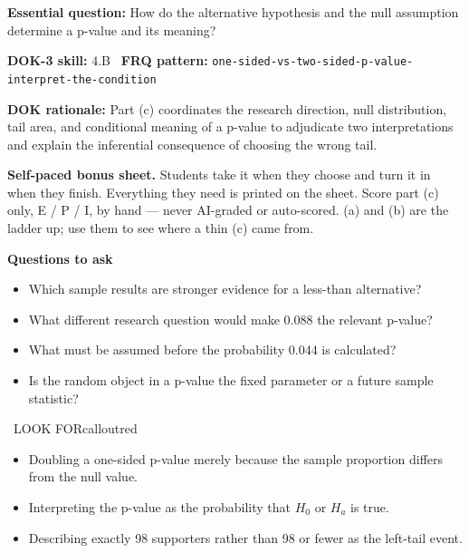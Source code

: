 \documentclass[11pt]{article}
\begin{document}
\textbf{Essential question:} How do the alternative hypothesis and the null assumption determine a p-value and its meaning?\par
\textbf{DOK-3 skill:} 4.B \textperiodcentered\ \textbf{FRQ pattern:} {\small\texttt{one-\allowbreak{}sided-\allowbreak{}vs-\allowbreak{}two-\allowbreak{}sided-\allowbreak{}p-\allowbreak{}value-\allowbreak{}interpret-\allowbreak{}the-\allowbreak{}condition}}\par
\textbf{DOK rationale:} Part (c) coordinates the research direction, null distribution, tail area, and conditional meaning of a p-value to adjudicate two interpretations and explain the inferential consequence of choosing the wrong tail.\par

\textbf{Self-paced bonus sheet.} Students take it when they choose and turn it in when they finish. Everything they need is printed on the sheet. Score part (c) only, E / P / I, by hand --- never AI-graded or auto-scored. (a) and (b) are the ladder up; use them to see where a thin (c) came from.\par

\textbf{Questions to ask}
\begin{itemize}[leftmargin=1.5em,itemsep=2pt,topsep=2pt]
  \item Which sample results are stronger evidence for a less-than alternative?
  \item What different research question would make $0.088$ the relevant p-value?
  \item What must be assumed before the probability $0.044$ is calculated?
  \item Is the random object in a p-value the fixed parameter or a future sample statistic?
\end{itemize}

\begin{callout}{\IconWarn\ LOOK FOR}{calloutred}
\begin{itemize}[leftmargin=1.5em,itemsep=2pt,topsep=2pt]
  \item Doubling a one-sided p-value merely because the sample proportion differs from the null value.
  \item Interpreting the p-value as the probability that $H_0$ or $H_a$ is true.
  \item Describing exactly 98 supporters rather than 98 or fewer as the left-tail event.
\end{itemize}
\end{callout}
\end{document}
